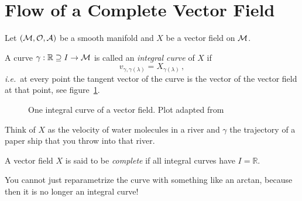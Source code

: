\section{Flow of a Complete Vector Field}
Let $(\mathcal{M}, \mathcal{O}, \mathcal{A})$ be a smooth manifold and $X$ be a vector field on $\mathcal{M}$. 
\begin{defn}
    A curve $\gamma: \mathbb{R} \supseteq I \to \mathcal{M}$ is called an \textit{integral curve}
    of $X$ if
    \begin{equation}
        v_{\gamma, \gamma(\lambda)} = X_{\gamma(\lambda)}\,,
    \end{equation}
    \textit{i.e.}\ at every point the tangent vector of the curve is the vector of the
    vector field at that point, see figure~\ref{fig:integralCurve}.
\end{defn}
\begin{figure}[tbh]
    \centering
    \caption{One integral curve of a vector field.
    Plot adapted from~\cite{texstackexchange:integralCurve}}
    \label{fig:integralCurve}
\end{figure}
\begin{note}
    Think of $X$ as the velocity of water molecules in a river and $\gamma$
    the trajectory of a paper ship that you throw into that river.
\end{note}
\begin{defn}
    A vector field $X$ is said to be \textit{complete} if all integral curves have
    $I=\mathbb{R}$.
\end{defn}
\begin{note}
    You cannot just reparametrize the curve with something like an arctan, because
    then it is no longer an integral curve!
\end{note}
